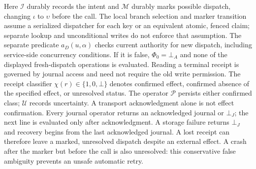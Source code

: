 Here $\mathcal I$ durably records the intent and $\mathcal M$ durably marks possible dispatch, changing $\iota$ to $\upsilon$ before the call. The local branch selection and marker transition assume a serialized dispatcher for each key or an equivalent atomic, fenced claim; separate lookup and unconditional writes do not enforce that assumption. The separate predicate $a_D(u,\alpha)$ checks current authority for new dispatch, including service-side concurrency conditions. If it is false, $\Phi_0=\bot_A$ and none of the displayed fresh-dispatch operations is evaluated. Reading a terminal receipt is governed by journal access and need not require the old write permission. The receipt classifier $\chi(r)\in\{1,0,\bot\}$ denotes confirmed effect, confirmed absence of the specified effect, or unresolved status. The operator $\mathcal P$ persists either confirmed class; $\mathcal U$ records uncertainty. A transport acknowledgment alone is not effect confirmation. Every journal operator returns an acknowledged journal or $\bot_J$; the next line is evaluated only after acknowledgment. A storage failure returns $\bot_J$ and recovery begins from the last acknowledged journal. A lost receipt can therefore leave a marked, unresolved dispatch despite an external effect. A crash after the marker but before the call is also unresolved: this conservative false ambiguity prevents an unsafe automatic retry.

